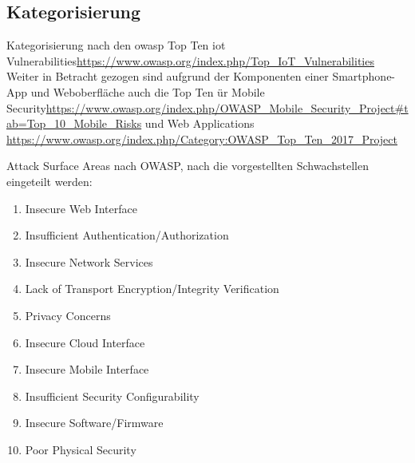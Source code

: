 \subsection{Kategorisierung}
    Kategorisierung nach den \gls{owasp} Top Ten \gls{iot} Vulnerabilities\sloppy\url{https://www.owasp.org/index.php/Top_IoT_Vulnerabilities}
    Weiter in Betracht gezogen sind aufgrund der Komponenten einer Smartphone-App und Weboberfläche auch die Top Ten ür Mobile Security\sloppy\url{https://www.owasp.org/index.php/OWASP_Mobile_Security_Project#tab=Top_10_Mobile_Risks} und Web Applications \sloppy\url{https://www.owasp.org/index.php/Category:OWASP_Top_Ten_2017_Project}

    Attack Surface Areas nach OWASP, nach die vorgestellten Schwachstellen eingeteilt werden:
    \begin{enumerate}[noitemsep]
        \item Insecure Web Interface
        \item Insufficient Authentication/Authorization
        \item Insecure Network Services
        \item Lack of Transport Encryption/Integrity Verification
        \item Privacy Concerns
        \item Insecure Cloud Interface
        \item Insecure Mobile Interface
        \item Insufficient Security Configurability
        \item Insecure Software/Firmware
        \item Poor Physical Security
    \end{enumerate}
    
